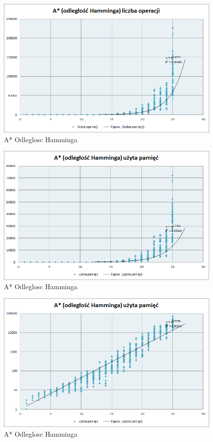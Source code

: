 \documentclass{classrep}
\begin{document}
\begin{figure}[ht]
\centering
			\includegraphics[scale=0.65]{pictures/A2_operacje_exp.png}
	\caption{A* Odleglosc Hamminga}
	\label{fig:A* Odleglosc Hamminga}
\end{figure}

\begin{figure}[ht]
\centering
			\includegraphics[scale=0.65]{pictures/A2_pamiec_exp.png}
	\caption{A* Odleglosc Hamminga}
	\label{fig:A* Odleglosc Hammingav}
\end{figure}

\begin{figure}[ht]
\centering
			\includegraphics[scale=0.65]{pictures/A2_pamiec_log.png}
	\caption{A* Odleglosc Hamminga}
	\label{fig:A* Odleglosc Hamminga}
\end{figure}
\end{document}
